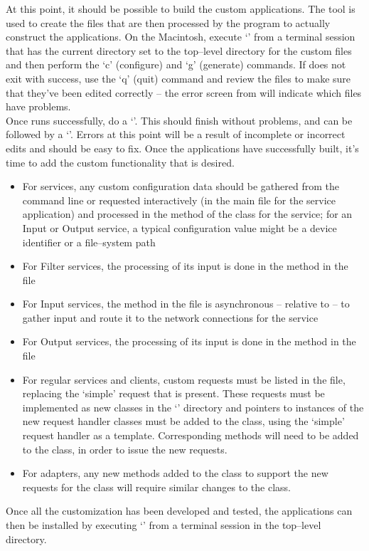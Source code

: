 \tertiaryEnd{}
At this point, it should be possible to build the custom applications.
The tool  is used to create the files that are then processed by the
 program to actually construct the applications.
On the Macintosh, execute `' from a terminal session that has the current
directory set to the top--level directory for the custom files and then perform the
`c' (configure) and `g' (generate) commands.
If  does not exit with success, use the `q' (quit) command and review the
 files to make sure that they've been edited correctly -- the error
screen from  will indicate which files have problems.\\

Once  runs successfully, do a `'.
This should finish without problems, and can be followed by a `'.
Errors at this point will be a result of incomplete or incorrect edits and should be easy
to fix.
\tertiaryEnd{}
Once the applications have successfully built, it's time to add the custom functionality
that is desired.
\begin{itemize}
\item For  services, any custom configuration data should be gathered from
the command line or requested interactively (in the main file for the service
application) and processed in the  method of the class for the service;
for an Input or Output service, a typical configuration value might be a device
identifier or a file--system path
\item For Filter services, the processing of its input is done in the 
method in the\\
 file
\item For Input services, the  method in the 
file is asynchronous -- relative to \mplusm{} -- to gather input and route it to the
\yarp{} network connections for the service
\item For Output services, the processing of its input is done in the 
method in the\\
 file
\item For regular services and clients, custom requests must be listed in the
 file, replacing the `simple' request that is present.
These requests must be implemented as new classes in the `' directory
and pointers to instances of the new request handler classes must be added to the
 class, using the `simple' request handler as a template.
Corresponding methods will need to be added to the  class, in order to
issue the new requests.
\item For adapters, any new methods added to the  class to support the
new requests for the  class will require similar changes to the
 class.
\end{itemize}
\tertiaryEnd{}
Once all the customization has been developed and tested, the applications can then be
installed by executing `' from a terminal session in the
top--level directory.
\tertiaryEnd{}
\secondaryEnd{}
\appendixEnd{}
